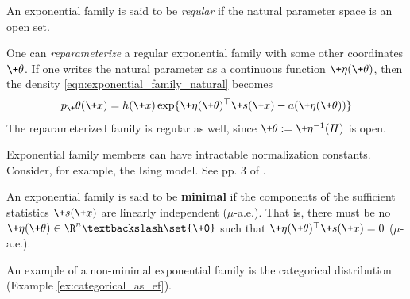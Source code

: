 \documentclass{article} %
\newcommand{\obs}{\+x}
\newcommand{\logNormalizerFunction}{a}
\newcommand{\sufficientStatsFunction}{\+s}
\newcommand{\carrierDensity}{h}
\newcommand{\param}{\+\theta}
\newcommand{\naturalParam}{\+\eta}
\newcommand{\naturalParamSpace}{H}
\begin{document}
\begin{definition}
An exponential family is said to be \textit{regular} if the natural parameter space is an open set.
\end{definition}

One can \textit{reparameterize} a regular exponential family with some other coordinates $\param$.  If one writes the natural parameter as a continuous function $\naturalParam(\param)$, then the density \eqref{eqn:exponential_family_natural} becomes
\begin{align}
\label{eqn:exponential_family}
 p_\param(\obs) = \carrierDensity(\obs) \exp \{ \naturalParam(\param)^\top \sufficientStatsFunction(\obs) - \logNormalizerFunction(\naturalParam(\param))\} 
 \end{align}
 The reparameterized family is regular as well, since $\param := \naturalParam^{-1}(\naturalParamSpace)$ is open. 


\begin{remark}
Exponential family members can have intractable normalization constants.  Consider, for example,  the Ising model.  See pp. 3 of \cite{taylor2013multiparameter}.
\end{remark}


\begin{definition}
An exponential family is said to be \textbf{minimal} if the components of the sufficient statistics $\sufficientStatsFunction(\obs)$ are linearly independent ($\mu$-a.e.).  That is, there must be no $\naturalParam(\param) \in \R^n \textbackslash \set{\+0}$ such that $\naturalParam(\param)^\top \sufficientStatsFunction(\obs) = 0$ ($\mu$-a.e.).
\label{def:minimal_exponential_families}
\end{definition}

  An example of a non-minimal exponential family is the categorical distribution (Example \ref{ex:categorical_as_ef}). 

\end{document}
